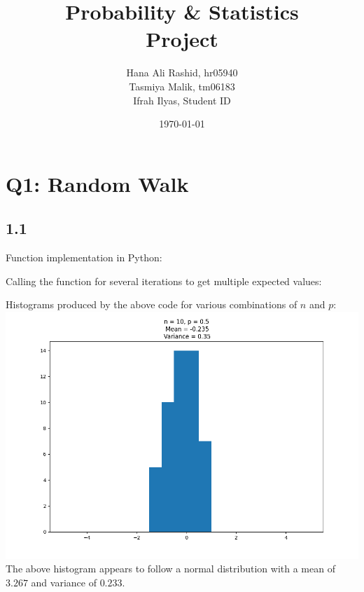 \documentclass[answers]{exam}
\title{Probability \& Statistics\\ Project}
\author{Hana Ali Rashid, hr05940\\ Tasmiya Malik, tm06183\\ Ifrah Ilyas, Student ID}
\date{\today{}}
\begin{document}
\maketitle



\section*{Q1: Random Walk}
\subsection*{1.1}
Function implementation in Python:

Calling the function for several iterations to get multiple expected values:

\pagebreak
Histograms produced by the above code for various combinations of $n$ and $p$:\\
\includegraphics[scale = 0.5]{Q1_histograms/q1_n = 10_ p = 0.5.png}\\
The above histogram appears to follow a normal distribution with a mean of $3.267$ and variance of $0.233$.\\
\end{document}
